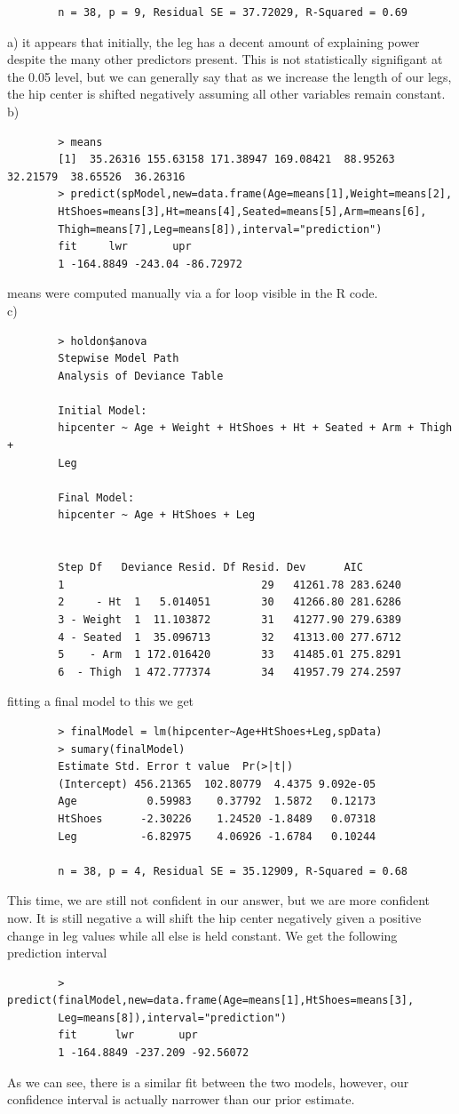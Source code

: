 \documentclass[11pt]{article}
\begin{document}
\begin{enumerate}
\begin{verbatim}
		n = 38, p = 9, Residual SE = 37.72029, R-Squared = 0.69
	\end{verbatim}
	a) it appears that initially, the leg has a decent amount of explaining power despite the many other predictors present. This is not statistically signifigant at the 0.05 level, but we can generally say that as we increase the length of our legs, the hip center is shifted negatively assuming all other variables remain constant.
	\\
	b)
	\begin{verbatim}
		> means
		[1]  35.26316 155.63158 171.38947 169.08421  88.95263  32.21579  38.65526  36.26316
		> predict(spModel,new=data.frame(Age=means[1],Weight=means[2],
		HtShoes=means[3],Ht=means[4],Seated=means[5],Arm=means[6],
		Thigh=means[7],Leg=means[8]),interval="prediction")
		fit     lwr       upr
		1 -164.8849 -243.04 -86.72972
	\end{verbatim}
	means were computed manually via a for loop visible in the R code.
	\\
	c)
	\begin{verbatim}
		> holdon$anova
		Stepwise Model Path 
		Analysis of Deviance Table
		
		Initial Model:
		hipcenter ~ Age + Weight + HtShoes + Ht + Seated + Arm + Thigh + 
		Leg
		
		Final Model:
		hipcenter ~ Age + HtShoes + Leg
		
		
		Step Df   Deviance Resid. Df Resid. Dev      AIC
		1                               29   41261.78 283.6240
		2     - Ht  1   5.014051        30   41266.80 281.6286
		3 - Weight  1  11.103872        31   41277.90 279.6389
		4 - Seated  1  35.096713        32   41313.00 277.6712
		5    - Arm  1 172.016420        33   41485.01 275.8291
		6  - Thigh  1 472.777374        34   41957.79 274.2597
	\end{verbatim}
	fitting a final model to this we get 
	\begin{verbatim}
		> finalModel = lm(hipcenter~Age+HtShoes+Leg,spData)
		> sumary(finalModel)
		Estimate Std. Error t value  Pr(>|t|)
		(Intercept) 456.21365  102.80779  4.4375 9.092e-05
		Age           0.59983    0.37792  1.5872   0.12173
		HtShoes      -2.30226    1.24520 -1.8489   0.07318
		Leg          -6.82975    4.06926 -1.6784   0.10244
		
		n = 38, p = 4, Residual SE = 35.12909, R-Squared = 0.68
	\end{verbatim}
	This time, we are still not confident in our answer, but we are more confident now. It is still negative a will shift the hip center negatively given a positive change in leg values while all else is held constant. We get the following prediction interval
	\begin{verbatim}
		> predict(finalModel,new=data.frame(Age=means[1],HtShoes=means[3],
		Leg=means[8]),interval="prediction")
		fit      lwr       upr
		1 -164.8849 -237.209 -92.56072
	\end{verbatim}
	As we can see, there is a similar fit between the two models, however, our confidence interval is actually narrower than our prior estimate.
\end{enumerate}
\end{document}
